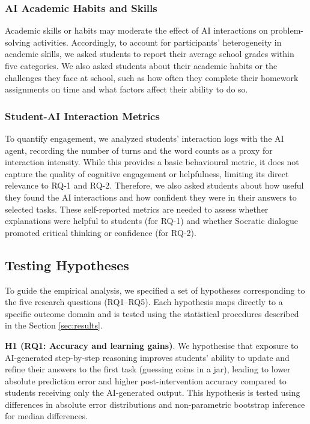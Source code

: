 \documentclass[
  11pt,
]{article}
\begin{document}
\subsubsection{AI Academic Habits and Skills}\label{ai-academic-habits-and-skills}

Academic skills or habits may moderate the effect of AI interactions on problem-solving activities. Accordingly, to account for participants' heterogeneity in academic skills, we asked students to report their average school grades within five categories. We also asked students about their academic habits or the challenges they face at school, such as how often they complete their homework assignments on time and what factors affect their ability to do so.

\subsubsection{Student-AI Interaction Metrics}\label{student-ai-interaction-metrics}

To quantify engagement, we analyzed students' interaction logs with the AI agent, recording the number of turns and the word counts as a proxy for interaction intensity. While this provides a basic behavioural metric, it does not capture the quality of cognitive engagement or helpfulness, limiting its direct relevance to RQ-1 and RQ-2. Therefore, we also asked students about how useful they found the AI interactions and how confident they were in their answers to selected tasks. These self-reported metrics are needed to assess whether explanations were helpful to students (for RQ-1) and whether Socratic dialogue promoted critical thinking or confidence (for RQ-2).

\subsection{Testing Hypotheses}\label{testing-hypotheses}

To guide the empirical analysis, we specified a set of hypotheses corresponding to the five research questions (RQ1--RQ5). Each hypothesis maps directly to a specific outcome domain and is tested using the statistical procedures described in the Section \ref{sec:results}.

\textbf{H1 (RQ1: Accuracy and learning gains)}.
We hypothesise that exposure to AI-generated step-by-step reasoning improves students' ability to update and refine their answers to the first task (guessing coins in a jar), leading to lower absolute prediction error and higher post-intervention accuracy compared to students receiving only the AI-generated output. This hypothesis is tested using differences in absolute error distributions and non-parametric bootstrap inference for median differences.
\end{document}

